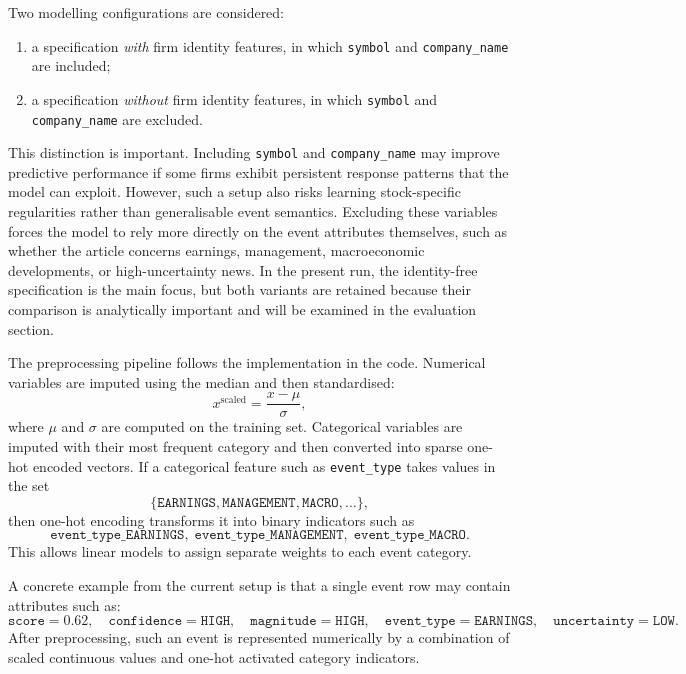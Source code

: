 Two modelling configurations are considered:
\begin{enumerate}
    \item a specification \emph{with} firm identity features, in which \texttt{symbol} and \texttt{company\_name} are included;
    \item a specification \emph{without} firm identity features, in which \texttt{symbol} and \texttt{company\_name} are excluded.
\end{enumerate}

This distinction is important. Including \texttt{symbol} and \texttt{company\_name} may improve predictive performance if some firms exhibit persistent response patterns that the model can exploit. However, such a setup also risks learning stock-specific regularities rather than generalisable event semantics. Excluding these variables forces the model to rely more directly on the event attributes themselves, such as whether the article concerns earnings, management, macroeconomic developments, or high-uncertainty news. In the present run, the identity-free specification is the main focus, but both variants are retained because their comparison is analytically important and will be examined in the evaluation section.

The preprocessing pipeline follows the implementation in the code. Numerical variables are imputed using the median and then standardised:
\[
x^{\text{scaled}} = \frac{x - \mu}{\sigma},
\]
where $\mu$ and $\sigma$ are computed on the training set. Categorical variables are imputed with their most frequent category and then converted into sparse one-hot encoded vectors. If a categorical feature such as \texttt{event\_type} takes values in the set
\[
\{\texttt{EARNINGS}, \texttt{MANAGEMENT}, \texttt{MACRO}, \ldots\},
\]
then one-hot encoding transforms it into binary indicators such as
\[
\texttt{event\_type\_EARNINGS},\;
\texttt{event\_type\_MANAGEMENT},\;
\texttt{event\_type\_MACRO}.
\]
This allows linear models to assign separate weights to each event category.

A concrete example from the current setup is that a single event row may contain attributes such as:
\[
\texttt{score} = 0.62,\quad
\texttt{confidence} = \texttt{HIGH},\quad
\texttt{magnitude} = \texttt{HIGH},\quad
\texttt{event\_type} = \texttt{EARNINGS},\quad
\texttt{uncertainty} = \texttt{LOW}.
\]
After preprocessing, such an event is represented numerically by a combination of scaled continuous values and one-hot activated category indicators.

